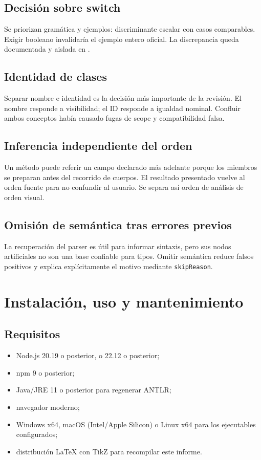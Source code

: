\documentclass[11pt,letterpaper,oneside]{report}
\newcommand{\archivo}[1]{\path{#1}}
\newcommand{\codigo}[1]{\texttt{#1}}
\begin{document}
\section{Decisión sobre switch}

Se priorizan gramática y ejemplos: discriminante escalar con casos comparables. Exigir
booleano invalidaría el ejemplo entero oficial. La discrepancia queda documentada y
aislada en \archivo{DECISIONES\_SEMANTICAS.md}.

\section{Identidad de clases}

Separar nombre e identidad es la decisión más importante de la revisión. El nombre
responde a visibilidad; el ID responde a igualdad nominal. Confluir ambos conceptos
había causado fugas de scope y compatibilidad falsa.

\section{Inferencia independiente del orden}

Un método puede referir un campo declarado más adelante porque los miembros se
preparan antes del recorrido de cuerpos. El resultado presentado vuelve al orden
fuente para no confundir al usuario. Se separa así orden de análisis de orden visual.

\section{Omisión de semántica tras errores previos}

La recuperación del parser es útil para informar sintaxis, pero sus nodos artificiales
no son una base confiable para tipos. Omitir semántica reduce falsos positivos y
explica explícitamente el motivo mediante \codigo{skipReason}.

\chapter{Instalación, uso y mantenimiento}

\section{Requisitos}

\begin{itemize}
  \item Node.js 20.19 o posterior, o 22.12 o posterior;
  \item npm 9 o posterior;
  \item Java/JRE 11 o posterior para regenerar ANTLR;
  \item navegador moderno;
  \item Windows x64, macOS (Intel/Apple Silicon) o Linux x64 para los ejecutables configurados;
  \item distribución LaTeX con TikZ para recompilar este informe.
\end{itemize}
\end{document}
